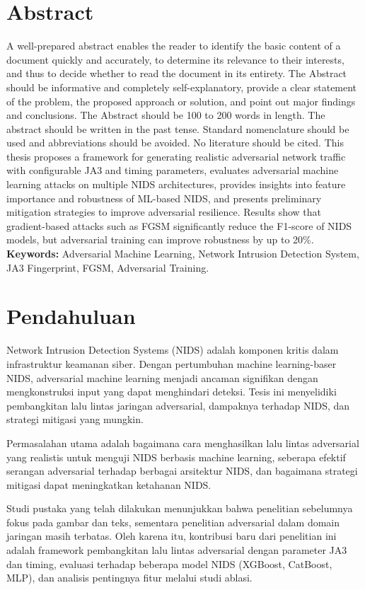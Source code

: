 \documentclass[10pt]{article}
\begin{document}
\section*{Abstract}
A well-prepared abstract enables the reader to identify the basic content of a document quickly and accurately, to determine its relevance to their interests, and thus to decide whether to read the document in its entirety. The Abstract should be informative and completely self-explanatory, provide a clear statement of the problem, the proposed approach or solution, and point out major findings and conclusions. The Abstract should be 100 to 200 words in length. The abstract should be written in the past tense. Standard nomenclature should be used and abbreviations should be avoided. No literature should be cited. This thesis proposes a framework for generating realistic adversarial network traffic with configurable JA3 and timing parameters, evaluates adversarial machine learning attacks on multiple NIDS architectures, provides insights into feature importance and robustness of ML-based NIDS, and presents preliminary mitigation strategies to improve adversarial resilience. Results show that gradient-based attacks such as FGSM significantly reduce the F1-score of NIDS models, but adversarial training can improve robustness by up to 20\%.
\vspace{0.5em}
\noindent
\textbf{Keywords:} Adversarial Machine Learning, Network Intrusion Detection System, JA3 Fingerprint, FGSM, Adversarial Training.

\section{Pendahuluan}
Network Intrusion Detection Systems (NIDS) adalah komponen kritis dalam infrastruktur keamanan siber. Dengan pertumbuhan machine learning-baser NIDS, adversarial machine learning menjadi ancaman signifikan dengan mengkonstruksi input yang dapat menghindari deteksi. Tesis ini menyelidiki pembangkitan lalu lintas jaringan adversarial, dampaknya terhadap NIDS, dan strategi mitigasi yang mungkin.

Permasalahan utama adalah bagaimana cara menghasilkan lalu lintas adversarial yang realistis untuk menguji NIDS berbasis machine learning, seberapa efektif serangan adversarial terhadap berbagai arsitektur NIDS, dan bagaimana strategi mitigasi dapat meningkatkan ketahanan NIDS.

Studi pustaka yang telah dilakukan menunjukkan bahwa penelitian sebelumnya fokus pada gambar dan teks, sementara penelitian adversarial dalam domain jaringan masih terbatas. Oleh karena itu, kontribusi baru dari penelitian ini adalah framework pembangkitan lalu lintas adversarial dengan parameter JA3 dan timing, evaluasi terhadap beberapa model NIDS (XGBoost, CatBoost, MLP), dan analisis pentingnya fitur melalui studi ablasi.
\end{document}

